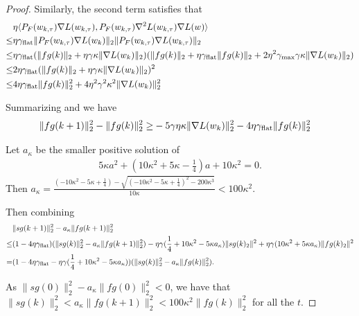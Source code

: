 \begin{proof}
    Similarly, the second term satisfies that 
    \begin{align*}
         &\eta \langle {P}_F(w_{k,\tau}) \nabla L(w_{k,\tau}), {P}_F (w_{k, \tau}) \nabla^2 L(w_{k, \tau}) \nabla L(w)\rangle \\
         \le&  \eta \gamma_{\mathrm{flat}} \| {P}_F (w_{k, \tau}) \nabla L(w_k) \|_2  \| {P}_F(w_{k,\tau}) \nabla L(w_{k,\tau}) \|_2 \\
         \le&  \eta \gamma_{\mathrm{flat}}  (\| fg(k) \|_2 + \eta \gamma \kappa \| \nabla L(w_k) \|_2) (\| fg(k) \|_2 + \eta \gamma_{\mathrm{flat}} \|  fg(k) \|_2 + 2\eta^2 \gamma_{\mathrm{max}} \gamma \kappa \| \nabla L(w_k)\|_2) \\
         \le&  2\eta \gamma_{\mathrm{flat}}  (\| fg(k) \|_2 + \eta \gamma \kappa \| \nabla L(w_k) \|_2)^2 \\
         \le& 4 \eta \gamma_{\mathrm{flat}} \| fg(k) \|_2^2 + 4\eta^2 \gamma^2 \kappa^2  \| \nabla L(w_k) \|_2^2
    \end{align*}

    Summarizing and we have
    \begin{align}
        \label{eq:fg}  
        \|fg(k + 1)\|_2^2 - \|fg(k)\|_2^2 \ge& - 5 \gamma \eta \kappa  \| \nabla L(w_k)\|_2^2 - 4 \eta \gamma_{\mathrm{flat}} \| fg(k) \|_2^2
    \end{align}

    Let $a_\kappa$ be the smaller positive solution of
    \begin{align*}
        5\kappa a^2 + (10\kappa^2 + 5\kappa - \frac{1}{4})a + 10 \kappa^2 = 0.
    \end{align*}
    Then $a_\kappa = \frac{(-10\kappa^2 - 5\kappa + \frac{1}{4}) - \sqrt{(-10\kappa^2 - 5\kappa + \frac{1}{4})^2 - 200 \kappa^3}}{10 \kappa}< 100 \kappa^2$.


    Then combining~
    \begin{align*}
        &\|sg(k+1)\|_2^2  - a_{\kappa} \|fg(k + 1)\|_2^2 \\
        \le& (1 - 4 \eta\gamma_{\mathrm{flat}}) (\|sg(k)\|_2^2  - a_{\kappa} \|fg(k + 1)\|_2^2) - \eta\gamma (\frac{1}{4} + 10\kappa^2 - 5 \kappa a_{\kappa}) \|sg(k)_2\|^2 + \eta \gamma (10 \kappa^2 + 5\kappa a_{\kappa}) \|fg(k)_2\|^2 \\
        =& (1 - 4 \eta\gamma_{\mathrm{flat}} - \eta\gamma(\frac{1}{4} + 10\kappa^2 - 5 \kappa a_{\kappa})) ( \|sg(k)\|_2^2  - a_{\kappa} \|fg(k)\|_2^2).
    \end{align*}

    As $\| sg(0) \|_2 ^2 - a_{\kappa} \|fg(0)\|_2^2 < 0$, we have that $\|sg(k)\|_2^2  < a_{\kappa} \|fg(k + 1)\|_2^2  < 100 \kappa^2 \| fg(k)\|_2^2$ for all the $t$.
\end{proof}


